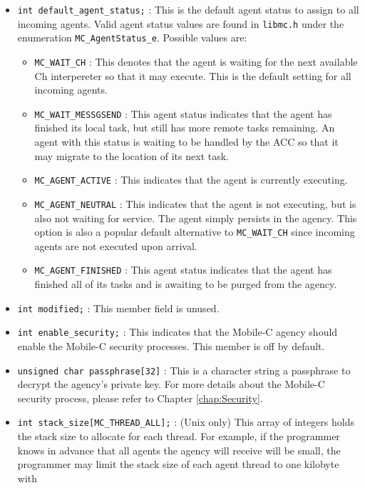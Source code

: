 \begin{itemize}
  \item \texttt{int default\_agent\_status;} : This is the default agent status
  to assign to all incoming agents. Valid agent status values are found in
  \texttt{libmc.h} under the enumeration \texttt{MC\_AgentStatus\_e}. Possible
  values are:
    \begin{itemize}
    \item \texttt{MC\_WAIT\_CH} : This denotes that the agent is waiting for the
    next available Ch interpereter so that it may execute. This is the default
    setting for all incoming agents.
    \item \texttt{MC\_WAIT\_MESSGSEND} : This agent status indicates that the
    agent has finished its local task, but still has more remote tasks remaining.
    An agent with this status is waiting to be handled by the ACC so that it may
    migrate to the location of its next task.
    \item \texttt{MC\_AGENT\_ACTIVE} : This indicates that the agent is currently
    executing.
    \item \texttt{MC\_AGENT\_NEUTRAL} : This indicates that the agent is not
    executing, but is also not waiting for service. The agent simply persists 
    in the agency. This option is also a popular default alternative to
    \texttt{MC\_WAIT\_CH} since incoming agents are not executed upon arrival.
    \item \texttt{MC\_AGENT\_FINISHED} : This agent status indicates that the
    agent has finished all of its tasks and is awaiting to be purged from the
    agency.
    \end{itemize}
  \item \texttt{int modified;} : This member field is unused.
  \item \texttt{int enable\_security;} : This indicates that the Mobile-C agency
  should enable the Mobile-C security processes. This member is off by default.
  \item \texttt{unsigned char passphrase[32]} : This is a character string a
  passphrase to decrypt the agency's private key. For more details about the
  Mobile-C security process, please refer to Chapter \ref{chap:Security}.
  \item \texttt{int stack\_size[MC\_THREAD\_ALL];} : (Unix only) This array of integers holds
  the stack size to allocate for each thread. For example, if the programmer
  knows in advance that all agents the agency will receive will be small, the
  programmer may limit the stack size of each agent thread to one kilobyte with

\end{itemize}
